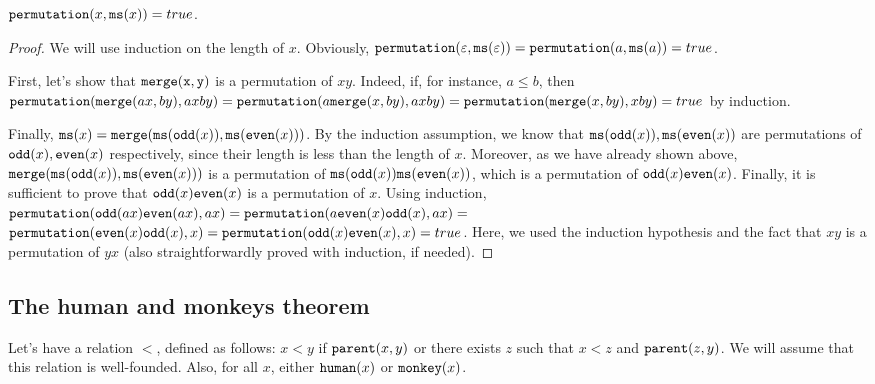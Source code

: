 \begin{lemma}
    ${\tt permutation}(x, {\tt ms}(x)) = true$.
\end{lemma}
\begin{proof}
    We will use induction on the length of $x$. Obviously, ${\tt permutation}(\varepsilon, {\tt ms}(\varepsilon)) = {\tt permutation}(a, {\tt ms}(a)) = true$.

    First, let's show that ${\tt merge(x, y)}$ is a permutation of $xy$. Indeed, if, for instance, $a \leq b$, then ${\tt permutation}({\tt merge}(ax, by), axby) = {\tt permutation}(a {\tt merge}(x, by), axby) = {\tt permutation}({\tt merge}(x, by), xby) = true$ by induction.

    Finally, ${\tt ms}(x) = {\tt merge}({\tt ms}({\tt odd}(x)), {\tt ms}({\tt even}(x)))$. By the induction assumption, we know that ${\tt ms}({\tt odd}(x)), {\tt ms}({\tt even}(x))$ are permutations of ${\tt odd}(x), {\tt even}(x)$ respectively, since their length is less than the length of $x$. Moreover, as we have already shown above, ${\tt merge}({\tt ms}({\tt odd}(x)), {\tt ms}({\tt even}(x)))$ is a permutation of ${\tt ms}({\tt odd}(x)) {\tt ms}({\tt even}(x))$, which is a permutation of ${\tt odd}(x) {\tt even}(x)$. Finally, it is sufficient to prove that ${\tt odd}(x) {\tt even}(x)$ is a permutation of $x$. Using induction, ${\tt permutation}({\tt odd}(ax) {\tt even}(ax), ax) = {\tt permutation}(a {\tt even}(x) {\tt odd}(x), ax) = $\\ ${\tt permutation}({\tt even}(x) {\tt odd}(x), x) = {\tt permutation}({\tt odd}(x) {\tt even}(x), x) = true$. Here, we used the induction hypothesis and the fact that $xy$ is a permutation of $yx$ (also straightforwardly proved with induction, if needed).
\end{proof}

\subsection{The human and monkeys theorem}

Let's have a relation $<$, defined as follows: $x < y$ if ${\tt parent}(x, y)$ or there exists $z$ such that $x < z$ and ${\tt parent}(z, y)$. We will assume that this relation is well-founded. Also, for all $x$, either ${\tt human}(x)$ or ${\tt monkey}(x)$.

